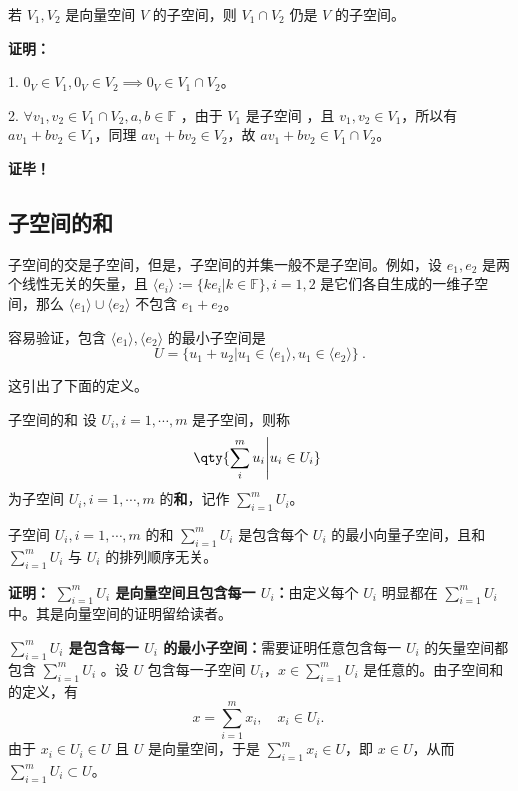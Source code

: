 \begin{theorem}{}\label{the_SubSpc_1}
若 $V_1, V_2$ 是向量空间 $V$ 的子空间，则 $V_1 \cap V_2$ 仍是 $V$ 的子空间。
\end{theorem}
\textbf{证明：}

1. $0_V \in V_1, 0_V \in V_2 \implies 0_V \in V_1 \cap V_2$。

2. $\forall v_1,v_2 \in V_1 \cap V_2, a, b \in \mathbb{F}$ ，由于 $V_1$ 是子空间 ，且 $v_1, v_2 \in V_1$，所以有 $a v_1 + b v_2 \in V_1$，同理 $a v_1 + b v_2 \in V_2$，故 $a v_1 + b v_2 \in V_1 \cap V_2$。

\textbf{证毕！}

\subsection{子空间的和}
子空间的交是子空间，但是，子空间的并集一般不是子空间。例如，设 $e_1,e_2$ 是两个线性无关的矢量，且 $\langle e_i\rangle:=\{k e_i|k\in\mathbb F\},i=1,2$ 是它们各自生成的一维子空间，那么 $\langle e_1\rangle\cup \langle e_2\rangle$ 不包含 $e_1+e_2$。

容易验证，包含 $\langle e_1\rangle,\langle e_2\rangle$ 的最小子空间是
\begin{equation}
U=\{u_1+u_2|u_1\in \langle e_1\rangle,u_1\in\langle e_2\rangle\}~.
\end{equation}

这引出了下面的定义。
\begin{definition}{子空间的和}
设 $U_i,i=1,\cdots,m$ 是子空间，则称
\begin{equation}
\qty{\sum_{i}^m u_i\Bigg|u_i\in U_i}~
\end{equation}
为子空间 $U_i,i=1,\cdots,m$ 的\textbf{和}，记作 $\sum_{i=1}^m U_i$。
\end{definition}

\begin{theorem}{}
子空间 $U_i,i=1,\cdots,m$ 的和 $\sum_{i=1}^m U_i$ 是包含每个 $U_i$ 的最小向量子空间，且和 $\sum_{i=1}^m U_i$ 与 $U_i$ 的排列顺序无关。
\end{theorem}
\textbf{证明：} \textbf{$\sum_{i=1}^m U_i$ 是向量空间且包含每一 $U_i$：}由定义每个 $U_i$ 明显都在 $\sum_{i=1}^m U_i$ 中。其是向量空间的证明留给读者。

\textbf{$\sum_{i=1}^m U_i$ 是包含每一 $U_i$ 的最小子空间：}需要证明任意包含每一 $U_i$ 的矢量空间都包含 $\sum_{i=1}^m U_i$ 。设 $U$ 包含每一子空间 $U_i$，$x\in \sum_{i=1}^m U_i$ 是任意的。由子空间和的定义，有
\begin{equation}
x=\sum_{i=1}^m x_i,\quad x_i\in U_i.~
\end{equation}
由于 $x_i\in U_i\in U$ 且 $U$ 是向量空间，于是 $\sum_{i=1}^m x_i\in U$，即 $x\in U$，从而 $\sum_{i=1}^m U_i\subset U$。

